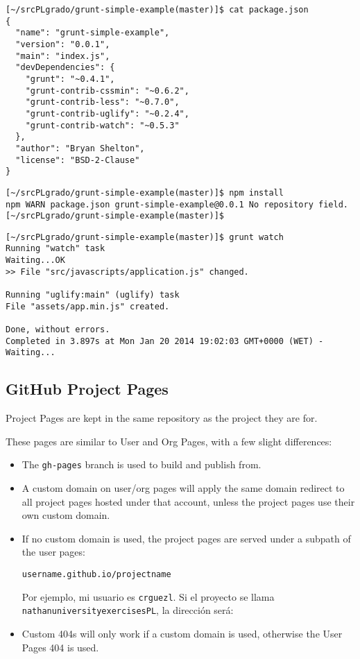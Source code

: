 \begin{verbatim}
[~/srcPLgrado/grunt-simple-example(master)]$ cat package.json 
{
  "name": "grunt-simple-example",
  "version": "0.0.1",
  "main": "index.js",
  "devDependencies": {
    "grunt": "~0.4.1",
    "grunt-contrib-cssmin": "~0.6.2",
    "grunt-contrib-less": "~0.7.0",
    "grunt-contrib-uglify": "~0.2.4",
    "grunt-contrib-watch": "~0.5.3"
  },
  "author": "Bryan Shelton",
  "license": "BSD-2-Clause"
}

\end{verbatim}

\begin{verbatim}
[~/srcPLgrado/grunt-simple-example(master)]$ npm install
npm WARN package.json grunt-simple-example@0.0.1 No repository field.
[~/srcPLgrado/grunt-simple-example(master)]$ 
\end{verbatim}


\begin{verbatim}
[~/srcPLgrado/grunt-simple-example(master)]$ grunt watch
Running "watch" task
Waiting...OK
>> File "src/javascripts/application.js" changed.

Running "uglify:main" (uglify) task
File "assets/app.min.js" created.

Done, without errors.
Completed in 3.897s at Mon Jan 20 2014 19:02:03 GMT+0000 (WET) - Waiting...
\end{verbatim}

\subsection{GitHub Project Pages}
\label{subsection:githubprojectpages}

Project Pages are kept in the same repository as the project they are for. 

These pages are similar to User and Org Pages, with a few slight differences:

\begin{itemize}
\item
The \verb|gh-pages| branch is used to build and publish from.
\item
A custom domain on user/org pages will apply the same domain redirect to all project pages hosted under that account, unless the project pages use their own custom domain.
\item
If no custom domain is used, the project pages are served under a subpath of the user pages: 
\begin{verbatim}
username.github.io/projectname
\end{verbatim}
Por ejemplo, mi usuario es \verb|crguezl|. Si el proyecto se llama \verb|nathanuniversityexercisesPL|, la dirección será:

\begin{center}
\end{center}
\item
Custom 404s will only work if a custom domain is used, otherwise the User Pages 404 is used.
\end{itemize}


